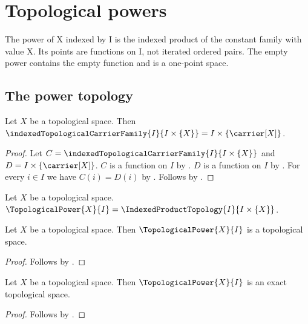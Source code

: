 \section{Topological powers}




The power of X indexed by I is the indexed product of the constant family
with value X. Its points are functions on I, not iterated ordered pairs.
The empty power contains the empty function and is a one-point space.

\subsection{The power topology}

\begin{proposition}\label{constant_topological_carrier_family}
    Let $X$ be a topological space.
    Then $\indexedTopologicalCarrierFamily{I}{I\times\{X\}}
        =I\times\{\carrier[X]\}$.
\end{proposition}
\begin{proof}
    Let $C=\indexedTopologicalCarrierFamily{I}{I\times\{X\}}$ and
        $D=I\times\{\carrier[X]\}$.
    $C$ is a function on $I$ by .
    $D$ is a function on $I$ by
        .
    For every $i\in I$ we have $C(i)=D(i)$ by
        .
    Follows by .
\end{proof}

\begin{definition}\label{topological_power}
    Let $X$ be a topological space.
    $\TopologicalPower{X}{I}=\IndexedProductTopology{I}{I\times\{X\}}$.
\end{definition}

\begin{classification}\label{topological_power_is_topological_space}
    Let $X$ be a topological space.
    Then $\TopologicalPower{X}{I}$ is a topological space.
\end{classification}
\begin{proof}
    Follows by .
\end{proof}

\begin{theorem}\label{topological_power_is_exact}
    Let $X$ be a topological space.
    Then $\TopologicalPower{X}{I}$ is an exact topological space.
\end{theorem}
\begin{proof}
    Follows by .
\end{proof}


